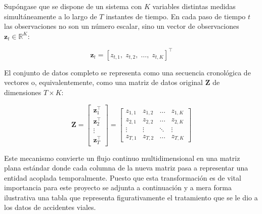 Supóngase que se dispone de un sistema con $K$ variables distintas medidas simultáneamente a lo largo de $T$ instantes de tiempo. En cada paso de tiempo $t$ las observaciones no son un número escalar, sino un vector de observaciones $\mathbf{z}_t \in \mathbb{R}^{K}$:

\begin{equation}
\mathbf{z}_t = \left[ z_{t,1},\; z_{t,2},\; \dots,\; z_{t,K} \right]^{\top}
\label{eq:vector-observaciones}
\end{equation}

El conjunto de datos completo se representa como una secuencia cronológica de vectores o, equivalentemente, como una matriz de datos original $\mathbf{Z}$ de dimensiones $T \times K$:

\begin{equation}
\mathbf{Z} =
\begin{bmatrix}
\mathbf{z}_1^{\top} \\
\mathbf{z}_2^{\top} \\
\vdots \\
\mathbf{z}_T^{\top}
\end{bmatrix}
=
\begin{bmatrix}
z_{1,1} & z_{1,2} & \dots  & z_{1,K} \\
z_{2,1} & z_{2,2} & \dots  & z_{2,K} \\
\vdots  & \vdots  & \ddots & \vdots  \\
z_{T,1} & z_{T,2} & \dots  & z_{T,K}
\end{bmatrix}
\label{eq:matriz-datos}
\end{equation}

Este mecanismo convierte un flujo continuo multidimensional en una matriz plana estándar donde cada columna de la nueva matriz pasa a representar una entidad acoplada temporalmente. Puesto que esta transformación es de vital importancia para este proyecto se adjunta a continuación y a mera forma ilustrativa una tabla que representa figurativamente el tratamiento que se le dio a los datos de accidentes viales.

